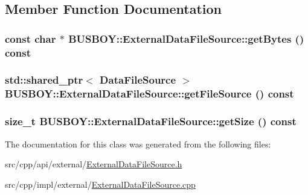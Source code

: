 \subsection{Member Function Documentation}
\hypertarget{classBUSBOY_1_1ExternalDataFileSource_a9a4f944051dd7b61eb6b97d73d510444}{
\subsubsection[{getBytes}]{\setlength{\rightskip}{0pt plus 5cm}const char $\ast$ BUSBOY::ExternalDataFileSource::getBytes () const}}
\label{classBUSBOY_1_1ExternalDataFileSource_a9a4f944051dd7b61eb6b97d73d510444}
\hypertarget{classBUSBOY_1_1ExternalDataFileSource_af5110d99884e270b4734ec590548c6e4}{
\subsubsection[{getFileSource}]{\setlength{\rightskip}{0pt plus 5cm}std::shared\_\-ptr$<$ {\bf DataFileSource} $>$ BUSBOY::ExternalDataFileSource::getFileSource () const}}
\label{classBUSBOY_1_1ExternalDataFileSource_af5110d99884e270b4734ec590548c6e4}
\hypertarget{classBUSBOY_1_1ExternalDataFileSource_ad1a296258ccc1809fb63fb48e3adae95}{
\subsubsection[{getSize}]{\setlength{\rightskip}{0pt plus 5cm}size\_\-t BUSBOY::ExternalDataFileSource::getSize () const}}
\label{classBUSBOY_1_1ExternalDataFileSource_ad1a296258ccc1809fb63fb48e3adae95}


The documentation for this class was generated from the following files:\begin{DoxyCompactItemize}
\item 
src/cpp/api/external/\hyperlink{ExternalDataFileSource_8h}{ExternalDataFileSource.h}\item 
src/cpp/impl/external/\hyperlink{ExternalDataFileSource_8cpp}{ExternalDataFileSource.cpp}\end{DoxyCompactItemize}
